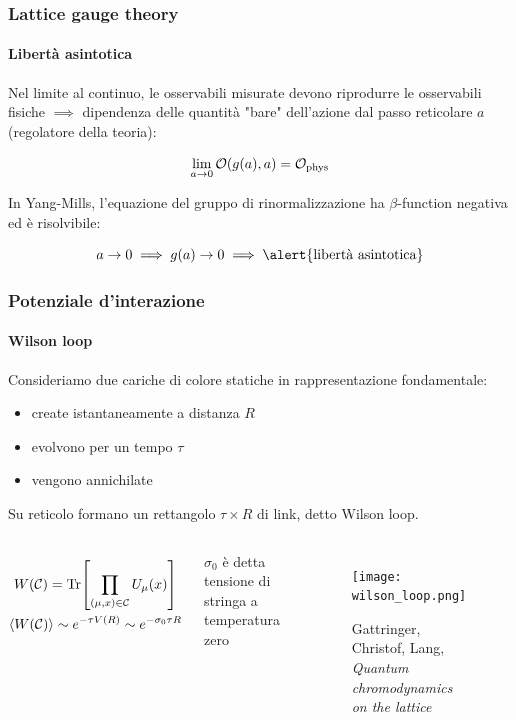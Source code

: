\documentclass{beamer}
\begin{document}
\begin{frame}
	\frametitle{Lattice gauge theory}
	\framesubtitle{Libertà asintotica}
	
	Nel limite al continuo, le osservabili misurate devono riprodurre le osservabili fisiche
	$\implies$ dipendenza delle quantità "bare" dell'azione dal passo reticolare $a$ (regolatore della teoria):

	\begin{equation*}
		\lim_{a \rightarrow 0} \mathcal{O}\qty(g(a), a) = \mathcal{O}_\text{phys}
	\end{equation*}

	In Yang-Mills, l'equazione del gruppo di rinormalizzazione ha $\beta$-function negativa ed è
	risolvibile:
	
	\begin{equation*}
		a \rightarrow 0 \implies g(a) \rightarrow 0 \implies \text{\alert{libertà asintotica}}
	\end{equation*}

\end{frame}

\begin{frame}
	\frametitle{Potenziale d'interazione}
	\framesubtitle{Wilson loop}

	Consideriamo due cariche di colore statiche in rappresentazione fondamentale:
	\begin{itemize}
		\item create istantaneamente a distanza $R$
		\item evolvono per un tempo $\tau$
		\item vengono annichilate
	\end{itemize}

	Su reticolo formano un rettangolo $\tau \times R$ di link, detto \alert{Wilson loop}.
	\begin{columns}
			\begin{equation*}
				\begin{gathered}
					W(\mathcal{C}) = \Tr[\prod_{(\mu,x)\in\mathcal{C}} U_\mu(x)] \\
					\expval{W(\mathcal{C})} \sim e^{-\tau V(R)} \sim e^{-\sigma_0 \tau R}
				\end{gathered}				
			\end{equation*}

			$\sigma_0$ è detta \alert{tensione di stringa a temperatura zero}
		
			\begin{figure}[h]
				\centering
				\texttt{[image: wilson\_loop.png]}
				\caption{Gattringer, Christof, Lang, \textit{Quantum chromodynamics on the lattice}}
			\end{figure}
	\end{columns}

\end{frame}
\end{document}
